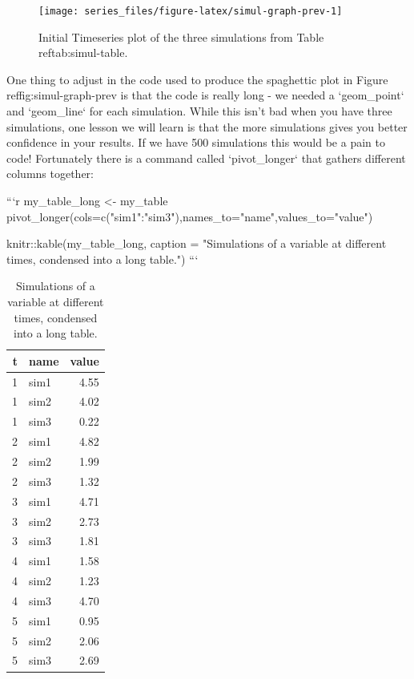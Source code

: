 \documentclass[
]{book}
\theoremstyle{definition}
\theoremstyle{definition}
\theoremstyle{definition}
\theoremstyle{remark}
\begin{document}
\begin{figure}

{\centering \texttt{[image: series\_files/figure-latex/simul-graph-prev-1]} 

}

\caption{Initial Timeseries plot of the three simulations from Table \\ref{tab:simul-table}.}\label{fig:simul-graph-prev}
\end{figure}

One thing to adjust in the code used to produce the spaghettic plot in Figure \\ref{fig:simul-graph-prev} is that the code is really long - we needed a `geom_point` and `geom_line` for each simulation.  While this isn't bad when you have three simulations, one lesson we will learn is that the more simulations gives you better confidence in your results. If we have 500 simulations this would be a pain to code! Fortunately there is a command called `pivot_longer` that gathers different columns together:


```r
my_table_long <- my_table %
  pivot_longer(cols=c("sim1":"sim3"),names_to="name",values_to="value")

knitr::kable(my_table_long, caption = "Simulations of a variable at different times, condensed into a long table.")
```

\begin{table}

\caption{\label{tab:simul-table-long}Simulations of a variable at different times, condensed into a long table.}
\centering
\begin{tabular}[t]{r|l|r}
\hline
t & name & value\\
\hline
1 & sim1 & 4.55\\
\hline
1 & sim2 & 4.02\\
\hline
1 & sim3 & 0.22\\
\hline
2 & sim1 & 4.82\\
\hline
2 & sim2 & 1.99\\
\hline
2 & sim3 & 1.32\\
\hline
3 & sim1 & 4.71\\
\hline
3 & sim2 & 2.73\\
\hline
3 & sim3 & 1.81\\
\hline
4 & sim1 & 1.58\\
\hline
4 & sim2 & 1.23\\
\hline
4 & sim3 & 4.70\\
\hline
5 & sim1 & 0.95\\
\hline
5 & sim2 & 2.06\\
\hline
5 & sim3 & 2.69\\
\hline
\end{tabular}
\end{table}
\end{document}
